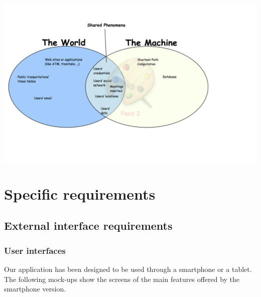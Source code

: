 \documentclass[12pt,titlepage]{article}
\begin{document}
\includegraphics[scale=0.65]{"worldAndMachine"} 
\pagebreak
\section{Specific requirements}\label{sec:crit}

\subsection{External interface requirements}\label{sec:mod1}
\subsubsection{User interfaces}\label{sec:mod1}
Our application has been designed to be used through a smartphone or a tablet.
The following mock-ups show the screens of the main features offered by the smartphone version. 
\end{document}
